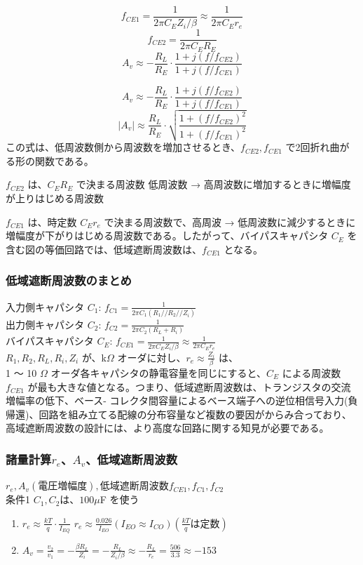 $$f_{CE1} = \frac{1}{2\pi C_E Z_i/\beta} \approx \frac{1}{2\pi C_E r_e}$$
$$f_{CE2} = \frac{1}{2\pi C_E R_E}$$
$$A_v \approx -\frac{R_L}{R_E} \cdot \frac{1+j(f/f_{CE2})}{1+j(f/f_{CE1})}$$

$$A_v \approx -\frac{R_L}{R_E} \cdot \frac{1+j(f/f_{CE2})}{1+j(f/f_{CE1})}$$
$$|A_v| \approx \frac{R_L}{R_E} \cdot \sqrt{\frac{1+(f/f_{CE2})^2}{1+(f/f_{CE1})^2}}$$
この式は、低周波数側から周波数を増加させるとき、$f_{CE2}, f_{CE1}$ で2回折れ曲がる形の関数である。

$f_{CE2}$ は、$C_E R_E$ で決まる周波数
低周波数 → 高周波数に増加するときに増幅度が上りはじめる周波数

$f_{CE1}$ は、時定数 $C_E r_e$ で決まる周波数で、高周波 → 低周波数に減少するときに
増幅度が下がりはじめる周波数である。したがって、バイパスキャパシタ $C_E$ を含む図の等価回路では、低域遮断周波数は、$f_{CE1}$ となる。

\subsubsection{低域遮断周波数のまとめ}
入力側キャパシタ $C_1$: $f_{C1} = \frac{1}{2\pi C_1(R_1//R_2//Z_i)}$\\
出力側キャパシタ $C_2$: $f_{C2} = \frac{1}{2\pi C_2(R_L+R_i)}$\\
バイパスキャパシタ $C_E$: $f_{CE1} = \frac{1}{2\pi C_E Z_i/\beta} \approx \frac{1}{2\pi C_E r_e}$\\

$R_1, R_2, R_L, R_i, Z_i$ が、k$\Omega$ オーダに対し、$r_e \approx \frac{Z_i}{\beta}$ は、\\
1 ～ 10 $\Omega$ オーダ各キャパシタの静電容量を同じにすると、$C_E$ による周波数 $f_{CE1}$ が最も大きな値となる。つまり、低域遮断周波数は、トランジスタの交流増幅率の低下、ベース- コレクタ間容量によるベース端子への逆位相信号入力(負帰還)、回路を組み立てる配線の分布容量など複数の要因がからみ合っており、高域遮断周波数の設計には、より高度な回路に関する知見が必要である。

\subsubsection{諸量計算$r_e$、$A_v$、低域遮断周波数}
$r_e, A_v(電圧増幅度), 低域遮断周波数 f_{CE1}, f_{C1}, f_{C2}$\\
条件1 $C_1, C_2$は、$100 \mu$F を使う\\
\begin{enumerate}
  \setlength{\parskip}{0cm} %
  \setlength{\itemsep}{0cm} %
  \item $r_e \approx \frac{kT}{q} \cdot \frac{1}{I_{EQ}}$
  $r_e \approx \frac{0.026}{I_{EO}} (I_{EO} \approx I_{CO}) (\frac{kT}{q} は定数)$
  \item $A_v = \frac{v_2}{v_1} = -\frac{\beta R_L}{Z_i} = -\frac{R_L}{Z_i/\beta} \approx -\frac{R_L}{r_e} = \frac{506}{3.3} \approx -153$
\end{enumerate}

